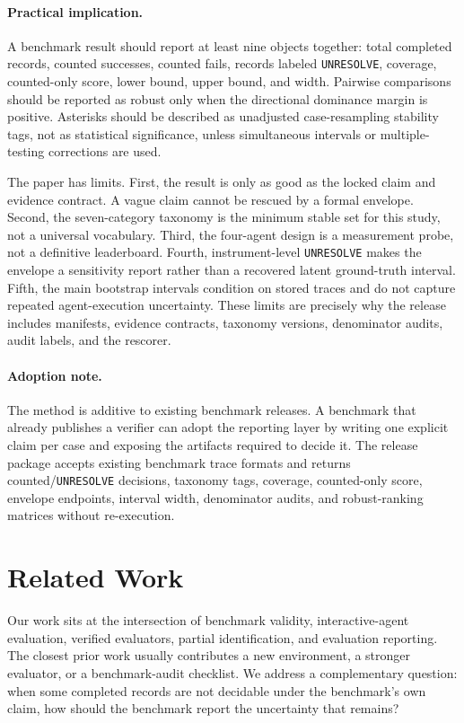\documentclass{article}
\begin{document}
\paragraph{Practical implication.}
A benchmark result should report at least nine objects together: total
completed records, counted successes, counted fails, records labeled
\texttt{UNRESOLVE}, coverage, counted-only score, lower bound, upper bound, and
width. Pairwise comparisons should be reported as robust only when the
directional dominance margin is positive. Asterisks should be described as
unadjusted case-resampling stability tags, not as statistical significance,
unless simultaneous intervals or multiple-testing corrections are used.

The paper has limits. First, the result is only as good as the locked claim and
evidence contract. A vague claim cannot be rescued by a formal envelope.
Second, the seven-category taxonomy is the minimum stable set for this study,
not a universal vocabulary. Third, the four-agent design is a measurement probe,
not a definitive leaderboard. Fourth, instrument-level \texttt{UNRESOLVE} makes
the envelope a sensitivity report rather than a recovered latent ground-truth
interval. Fifth, the main bootstrap intervals condition on stored traces and do
not capture repeated agent-execution uncertainty. These limits are precisely
why the release includes manifests, evidence contracts, taxonomy versions,
denominator audits, audit labels, and the rescorer.

\paragraph{Adoption note.}
The method is additive to existing benchmark releases. A benchmark that already
publishes a verifier can adopt the reporting layer by writing one explicit
claim per case and exposing the artifacts required to decide it. The release
package accepts existing benchmark trace formats and returns
counted/\texttt{UNRESOLVE} decisions, taxonomy tags, coverage, counted-only
score, envelope endpoints, interval width, denominator audits, and
robust-ranking matrices without re-execution.

\section{Related Work}
\label{sec:related-work}

Our work sits at the intersection of benchmark validity, interactive-agent
evaluation, verified evaluators, partial identification, and evaluation
reporting. The closest prior work usually contributes a new environment, a
stronger evaluator, or a benchmark-audit checklist. We address a complementary
question: when some completed records are not decidable under the benchmark's
own claim, how should the benchmark report the uncertainty that remains?
\end{document}
